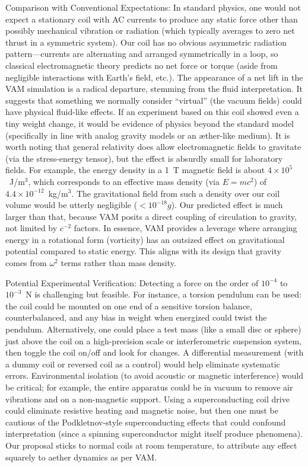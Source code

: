 \documentclass[twocolumn,aps,pre,floatfix,nofootinbib]{revtex4-2}
\begin{document}
Comparison with Conventional Expectations: In standard physics, one would not expect a stationary coil with AC currents to produce any static force other than possibly mechanical vibration or radiation (which typically averages to zero net thrust in a symmetric system). Our coil has no obvious asymmetric radiation pattern—currents are alternating and arranged symmetrically in a loop, so classical electromagnetic theory predicts no net force or torque (aside from negligible interactions with Earth’s field, etc.). The appearance of a net lift in the VAM simulation is a radical departure, stemming from the fluid interpretation. It suggests that something we normally consider “virtual” (the vacuum fields) could have physical fluid-like effects. If an experiment based on this coil showed even a tiny weight change, it would be evidence of physics beyond the standard model (specifically in line with analog gravity models or an æther-like medium). It is worth noting that general relativity does allow electromagnetic fields to gravitate (via the stress-energy tensor), but the effect is absurdly small for laboratory fields. For example, the energy density in a 1~T magnetic field is about $4\times10^5$~J/m$^3$, which corresponds to an effective mass density (via $E=mc^2$) of $4.4\times10^{-12}$~kg/m$^3$. The gravitational field from such a density over our coil volume would be utterly negligible ($<10^{-18}g$). Our predicted effect is much larger than that, because VAM posits a direct coupling of circulation to gravity, not limited by $c^{-2}$ factors. In essence, VAM provides a leverage where arranging energy in a rotational form (vorticity) has an outsized effect on gravitational potential compared to static energy. This aligns with its design that gravity comes from $\omega^2$ terms rather than mass density.


Potential Experimental Verification: Detecting a force on the order of $10^{-4}$ to $10^{-3}$~N is challenging but feasible. For instance, a torsion pendulum can be used: the coil could be mounted on one end of a sensitive torsion balance, counterbalanced, and any bias in weight when energized could twist the pendulum. Alternatively, one could place a test mass (like a small disc or sphere) just above the coil on a high-precision scale or interferometric suspension system, then toggle the coil on/off and look for changes. A differential measurement (with a dummy coil or reversed coil as a control) would help eliminate systematic errors. Environmental isolation (to avoid acoustic or magnetic interference) would be critical; for example, the entire apparatus could be in vacuum to remove air vibrations and on a non-magnetic support. Using a superconducting coil drive could eliminate resistive heating and magnetic noise, but then one must be cautious of the Podkletnov-style superconducting effects that could confound interpretation (since a spinning superconductor might itself produce phenomena). Our proposal sticks to normal coils at room temperature, to attribute any effect squarely to aether dynamics as per VAM.
\end{document}
